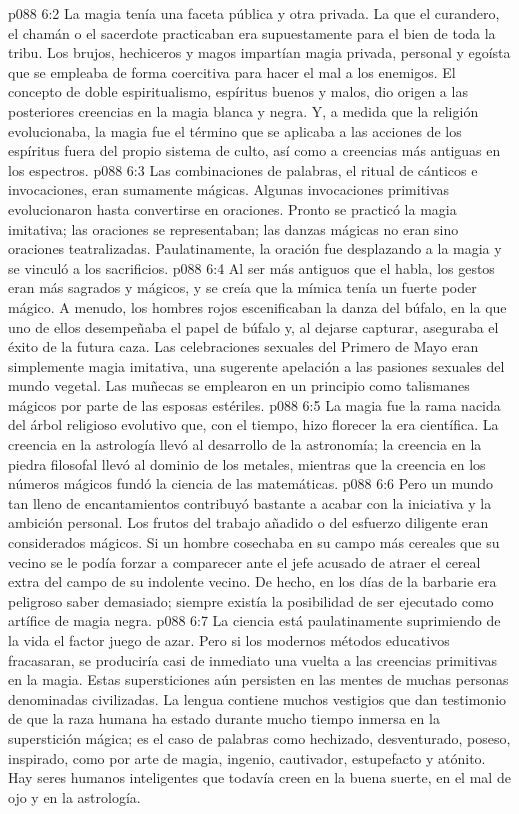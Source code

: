 \vs p088 6:2 La magia tenía una faceta pública y otra privada. La que el curandero, el chamán o el sacerdote practicaban era supuestamente para el bien de toda la tribu. Los brujos, hechiceros y magos impartían magia privada, personal y egoísta que se empleaba de forma coercitiva para hacer el mal a los enemigos. El concepto de doble espiritualismo, espíritus buenos y malos, dio origen a las posteriores creencias en la magia blanca y negra. Y, a medida que la religión evolucionaba, la magia fue el término que se aplicaba a las acciones de los espíritus fuera del propio sistema de culto, así como a creencias más antiguas en los espectros.
\vs p088 6:3 Las combinaciones de palabras, el ritual de cánticos e invocaciones, eran sumamente mágicas. Algunas invocaciones primitivas evolucionaron hasta convertirse en oraciones. Pronto se practicó la magia imitativa; las oraciones se representaban; las danzas mágicas no eran sino oraciones teatralizadas. Paulatinamente, la oración fue desplazando a la magia y se vinculó a los sacrificios.
\vs p088 6:4 Al ser más antiguos que el habla, los gestos eran más sagrados y mágicos, y se creía que la mímica tenía un fuerte poder mágico. A menudo, los hombres rojos escenificaban la danza del búfalo, en la que uno de ellos desempeñaba el papel de búfalo y, al dejarse capturar, aseguraba el éxito de la futura caza. Las celebraciones sexuales del Primero de Mayo eran simplemente magia imitativa, una sugerente apelación a las pasiones sexuales del mundo vegetal. Las muñecas se emplearon en un principio como talismanes mágicos por parte de las esposas estériles.
\vs p088 6:5 \pc La magia fue la rama nacida del árbol religioso evolutivo que, con el tiempo, hizo florecer la era científica. La creencia en la astrología llevó al desarrollo de la astronomía; la creencia en la piedra filosofal llevó al dominio de los metales, mientras que la creencia en los números mágicos fundó la ciencia de las matemáticas.
\vs p088 6:6 \pc Pero un mundo tan lleno de encantamientos contribuyó bastante a acabar con la iniciativa y la ambición personal. Los frutos del trabajo añadido o del esfuerzo diligente eran considerados mágicos. Si un hombre cosechaba en su campo más cereales que su vecino se le podía forzar a comparecer ante el jefe acusado de atraer el cereal extra del campo de su indolente vecino. De hecho, en los días de la barbarie era peligroso saber demasiado; siempre existía la posibilidad de ser ejecutado como artífice de magia negra.
\vs p088 6:7 La ciencia está paulatinamente suprimiendo de la vida el factor juego de azar. Pero si los modernos métodos educativos fracasaran, se produciría casi de inmediato una vuelta a las creencias primitivas en la magia. Estas supersticiones aún persisten en las mentes de muchas personas denominadas civilizadas. La lengua contiene muchos vestigios que dan testimonio de que la raza humana ha estado durante mucho tiempo inmersa en la superstición mágica; es el caso de palabras como hechizado, desventurado, poseso, inspirado, como por arte de magia, ingenio, cautivador, estupefacto y atónito. Hay seres humanos inteligentes que todavía creen en la buena suerte, en el mal de ojo y en la astrología.
